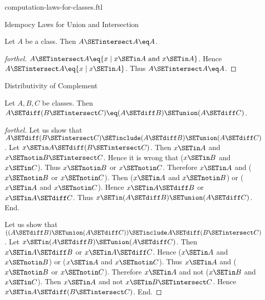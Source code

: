 \documentclass{naproche-library}
\begin{document}
\begin{smodule}[title=Computation Laws For Classes]{computation-laws-for-classes.ftl}
\begin{sfragment}{Idempocy Laws for Union and Intersection}
  \begin{proposition}[forthel,id=FOUNDATIONS_02_4053144145231872]
    Let $A$ be a class.
    Then $A \SETintersect A \eq A$.
  \end{proposition}
  \begin{proof}[forthel]
    $A \SETintersect A \eq \{ x \mid x \SETin A\text{ and }x \SETin A \}$.
    Hence $A \SETintersect A \eq \{ x \mid x \SETin A \}$.
    Thus $A \SETintersect A \eq A$.
  \end{proof}
\end{sfragment}

\begin{sfragment}{Distributivity of Complement}
  \begin{proposition}[forthel,id=FOUNDATIONS_02_5296031436636160]
    Let $A, B, C$ be classes.
    Then $A \SETdiff (B \SETintersect C) \eq (A \SETdiff B) \SETunion (A \SETdiff C)$.
  \end{proposition}
  \begin{proof}[forthel]
    Let us show that $A \SETdiff (B \SETintersect C) \SETinclude (A \SETdiff B) \SETunion (A \SETdiff C)$.
      Let $x \SETin A \SETdiff (B \SETintersect C)$.
      Then $x \SETin A$ and $x \SETnotin B \SETintersect C$.
      Hence it is wrong that ($x \SETin B$ and $x \SETin C$).
      Thus $x \SETnotin B$ or $x \SETnotin C$.
      Therefore $x \SETin A$ and ($x \SETnotin B$ or $x \SETnotin C$).
      Then ($x \SETin A$ and $x \SETnotin B$) or ($x \SETin A$ and $x \SETnotin C$).
      Hence $x \SETin A \SETdiff B$ or $x \SETin A \SETdiff C$.
      Thus $x \SETin (A \SETdiff B) \SETunion (A \SETdiff C)$.
    End.

    Let us show that $((A \SETdiff B) \SETunion (A \SETdiff C)) \SETinclude A \SETdiff (B \SETintersect C)$. %
      Let $x \SETin (A \SETdiff B) \SETunion (A \SETdiff C)$.
      Then $x \SETin A \SETdiff B$ or $x \SETin A \SETdiff C$.
      Hence ($x \SETin A$ and $x \SETnotin B$) or ($x \SETin A$ and $x \SETnotin C$).
      Thus $x \SETin A$ and ($x \SETnotin B$ or $x \SETnotin C$).
      Therefore $x \SETin A$ and not ($x \SETin B$ and $x \SETin C$).
      Then $x \SETin A$ and not $x \SETin B \SETintersect C$.
      Hence $x \SETin A \SETdiff (B \SETintersect C)$.
    End.
  \end{proof}


\end{sfragment}
\end{smodule}
\end{document}
